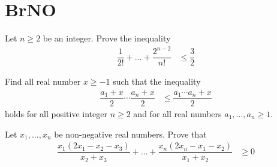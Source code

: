 \documentclass{subfile}
\begin{document}
	\section{BrNO}\label{sec:brmo}
	
		\begin{problem}[$2018$, problem $9$]
			Let $n\geq2$ be an integer. Prove the inequality
				\begin{align*}
					\dfrac{1}{2!}+\ldots+\dfrac{2^{n-2}}{n!}
						& \leq\dfrac{3}{2}
				\end{align*}
		\end{problem}
	
		\begin{problem}
			Find all real number $x\geq-1$ such that the inequality
				\begin{align*}
					\dfrac{a_{1}+x}{2}\cdots\dfrac{a_{n}+x}{2}
						& \leq \dfrac{a_{1}\cdots a_{n}+x}{2}
				\end{align*}
			holds for all positive integer $n\geq2$ and for all real numbers $a_{1},\ldots,a_{n}\geq1$.
		\end{problem}
	
		\begin{problem}
			Let $x_{1},\ldots,x_{n}$ be non-negative real numbers. Prove that
				\begin{align*}
					\dfrac{x_{1}(2x_{1}-x_{2}-x_{3})}{x_{2}+x_{3}}+\ldots+\dfrac{x_{n}(2x_{n}-x_{1}-x_{2})}{x_{1}+x_{2}}
						& \geq0
				\end{align*}
		\end{problem}
\end{document}
